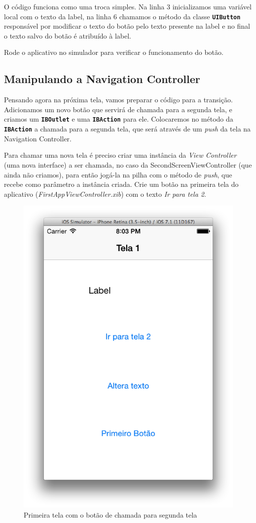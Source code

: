 \documentclass[a4paper,12pt,brazil,oneside]{book}
\begin{document}
O código funciona como uma troca simples. Na linha 3 inicializamos uma variável local com o texto da label, na linha 6 chamamos o método da classe \texttt{\textbf{UIButton}} responsável por modificar o texto do botão pelo texto presente na label e no final o texto salvo do botão é atribuído à label.

Rode o aplicativo no simulador para verificar o funcionamento do botão.

\subsection{Manipulando a Navigation Controller}


Pensando agora na próxima tela, vamos preparar o código para a transição. Adicionamos um novo botão que servirá de chamada para a segunda tela, e criamos um \texttt{\textbf{IBOutlet}} e uma \texttt{\textbf{IBAction}} para ele. Colocaremos no método da \texttt{\textbf{IBAction}} a chamada para a segunda tela, que será através de um \emph{push} da tela na Navigation Controller.


Para chamar uma nova tela é preciso criar uma instância da \emph{View Controller} (uma nova interface) a ser chamada, no caso da SecondScreenViewController (que ainda não criamos), para então jogá-la na pilha com o método de \emph{push}, que recebe como parâmetro a instância criada. Crie um botão na primeira tela do aplicativo (\emph{FirstAppViewController.xib}) com o texto \emph{Ir para tela 2}.


\begin{figure}[H]
  \centering
  \includegraphics[width=.55\textwidth]{figuras/3/tela_novo_projeto_31.png}
  \caption{Primeira tela com o botão de chamada para segunda tela}
  \label{fig:a}
\end{figure}
\end{document}
